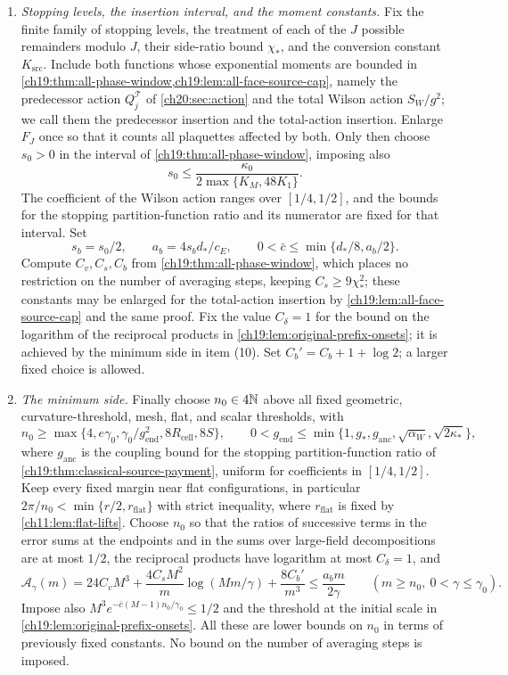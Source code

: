 \begin{theorem}
\begin{enumerate}[label=(\arabic*)]
\item \emph{Stopping levels, the insertion interval, and the moment constants.} Fix the finite family of stopping levels, the treatment of each of the $J$ possible remainders modulo $J$, their side-ratio bound $\chi_*$, and the conversion constant $K_{\mathrm{src}}$. Include both functions whose exponential moments are bounded in \cref{ch19:thm:all-phase-window,ch19:lem:all-face-source-cap}, namely the predecessor action $Q_j^{\mathcal T}$ of \cref{ch20:sec:action} and the total Wilson action $S_W/g^2$; we call them the predecessor insertion and the total-action insertion. Enlarge $F_J$ once so that it counts all plaquettes affected by both. Only then choose $s_0>0$ in the interval of \cref{ch19:thm:all-phase-window}, imposing also
\[
 s_0\le\frac{\kappa_0}{2\max\{K_M,48K_1\}}.
\]
The coefficient of the Wilson action ranges over $[1/4,1/2]$, and the bounds for the stopping partition-function ratio and its numerator are fixed for that interval. Set
\[
 s_b=s_0/2,\qquad a_b=4s_bd_*/c_E,\qquad 0<\bar c\le\min\{d_*/8,a_b/2\}.
\]
Compute $C_v,C_s,C_b$ from \cref{ch19:thm:all-phase-window}, which places no restriction on the number of averaging steps, keeping $C_s\ge9\chi_*^2$; these constants may be enlarged for the total-action insertion by \cref{ch19:lem:all-face-source-cap} and the same proof. Fix the value $C_\delta=1$ for the bound on the logarithm of the reciprocal products in \cref{ch19:lem:original-prefix-onsets}; it is achieved by the minimum side in item \textup{(10)}. Set $C_b'=C_b+1+\log2$; a larger fixed choice is allowed.

\item \emph{The minimum side.} Finally choose $n_0\in4\mathbb N$ above all fixed geometric, curvature-threshold, mesh, flat, and scalar thresholds, with
\[
 n_0\ge\max\{4,e\gamma_0,\gamma_0/g_{\mathrm{end}}^2,8R_{\mathrm{cell}},8S\},\qquad
 0<g_{\mathrm{end}}\le\min\{1,g_*,g_{\mathrm{anc}},\sqrt{\alpha_W},\sqrt{2\kappa_*}\},
\]
where $g_{\mathrm{anc}}$ is the coupling bound for the stopping partition-function ratio of \cref{ch19:thm:classical-source-payment}, uniform for coefficients in $[1/4,1/2]$. Keep every fixed margin near flat configurations, in particular $2\pi/n_0<\min\{r/2,r_{\mathrm{flat}}\}$ with strict inequality, where $r_{\mathrm{flat}}$ is fixed by \cref{ch11:lem:flat-lifts}. Choose $n_0$ so that the ratios of successive terms in the error sums at the endpoints and in the sums over large-field decompositions are at most $1/2$, the reciprocal products have logarithm at most $C_\delta=1$, and
\begin{equation}\label{ch20:eq:entropy-per-cell}
 \mathcal A_\gamma(m)=24C_vM^3+\frac{4C_sM^2}{m}\log(Mm/\gamma)+\frac{8C_b'}{m^3}\le\frac{a_bm}{2\gamma}
 \qquad(m\ge n_0,\ 0<\gamma\le\gamma_0).
\end{equation}
Impose also $M^3e^{-\bar c(M-1)n_0/\gamma_0}\le1/2$ and the threshold at the initial scale in \cref{ch19:lem:original-prefix-onsets}. All these are lower bounds on $n_0$ in terms of previously fixed constants. No bound on the number of averaging steps is imposed.
\end{enumerate}


\end{theorem}
